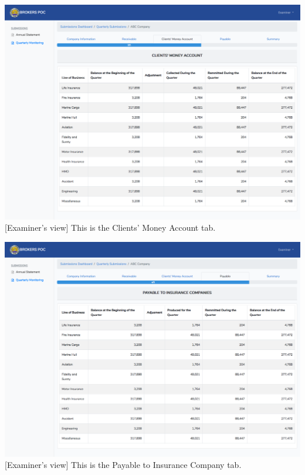 \documentclass{article}
\begin{document}
\includegraphics[keepaspectratio=true]{up-ic-screens/image5}{}[Examiner’s view] This is the Clients’ Money Account
tab.%

\includegraphics[keepaspectratio=true]{up-ic-screens/image175}{}[Examiner’s view] This is the Payable to Insurance Company
tab.%
\end{document}
